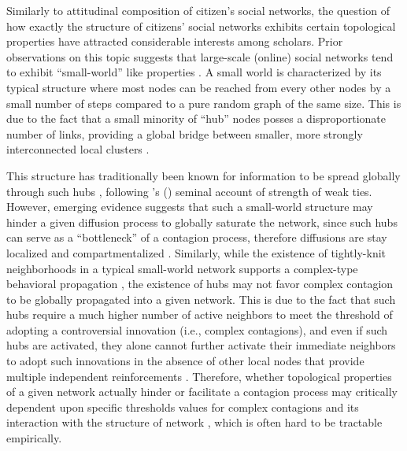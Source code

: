 \documentclass[man, 12pt, a4paper, noextraspace]{apa6}
\begin{document}
    Similarly to attitudinal composition of citizen's social networks, the question of how exactly the structure of citizens' social networks exhibits certain topological properties have attracted considerable interests among scholars. Prior observations on this topic suggests that large-scale (online) social networks tend to exhibit \enquote{small-world} like properties \parencite{kumar2010structure, ugander2011anatomy}. A small world is characterized by its typical structure where most nodes can be reached from every other nodes by a small number of steps compared to a pure random graph of the same size. This is due to the fact that a small minority of \enquote{hub} nodes posses a disproportionate number of links, providing a global bridge between smaller, more strongly interconnected local clusters \parencite{barabasi2004linked}. 
    
    This structure has traditionally been known for information to be spread globally through such hubs \parencite[e.g.,][]{Bakshy_2012}, following \citeauthor{granovetter1977strength}'s (\citeyear{granovetter1977strength}) seminal account of strength of weak ties. However, emerging evidence suggests that such a small-world structure may hinder a given diffusion process to globally saturate the network, since such hubs can serve as a \enquote{bottleneck} of a contagion process, therefore diffusions are stay localized and compartmentalized \parencite[e.g.,][]{banos2013diffusion, centola2007complex}. Similarly, while the existence of tightly-knit neighborhoods in a typical small-world network supports a complex-type behavioral propagation \parencite[i.e., an innovation that runs counter to prevalent norms and values:][]{Centola2010Sience}, the existence of hubs may not favor complex contagion to be globally propagated into a given network. This is due to the fact that such hubs require a much higher number of active neighbors to meet the threshold of adopting a controversial innovation (i.e., complex contagions), and even if such hubs are activated, they alone cannot further activate their immediate neighbors to adopt such  innovations in the absence of other local nodes that provide multiple independent reinforcements \parencite{Centola2007449}. Therefore, whether topological properties of a given network actually hinder or facilitate a contagion process may critically dependent upon specific thresholds values for complex contagions and its interaction with the structure of network \parencite[e.g.,][]{Centola2007449}, which is often hard to be tractable empirically.   
    
\end{document}

